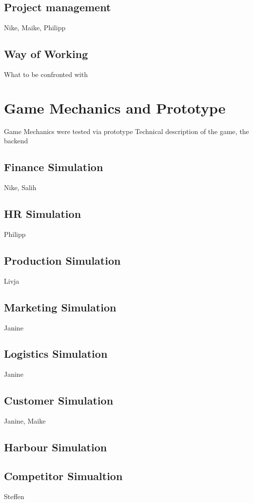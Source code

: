 \documentclass[11pt,titlepage,oneside,openany]{book}
\begin{document}
\section{Project management}
Nike, Maike, Philipp
\section{Way of Working}
What to be confronted with

\chapter{Game Mechanics and Prototype}
\label{cha:alg}
Game Mechanics were tested via prototype
Technical description of the game, the backend

\section{Finance Simulation}
\label{sec:diag}
Nike, Salih

\section{HR Simulation}
Philipp

\section{Production Simulation}
\label{sec:products}
Livja

\section{Marketing Simulation}
Janine

\section{Logistics Simulation}
Janine

\section{Customer Simulation}
\label{sec:customsim}
Janine, Maike

\section{Harbour Simulation}

\section{Competitor Simualtion}
Steffen
\end{document}
